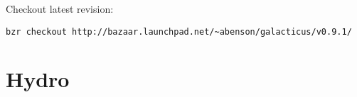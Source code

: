 \documentclass[a4paper,english,10.5pt]{scrartcl}
\begin{document}
Checkout latest revision: 
\begin{verbatim}
bzr checkout http://bazaar.launchpad.net/~abenson/galacticus/v0.9.1/
\end{verbatim}

\section{Hydro}


\renewcommand{\bibsection}{\section{References}}
\setlength{\bibhang}{1.24cm}
\setlength{\parindent}{3cm}
\setlength{\bibsep}{0cm}

\gdef\harvardand{\&}
\end{document}
